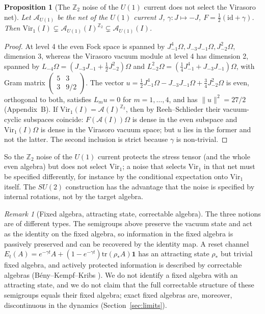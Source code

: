 \documentclass[12pt]{article}
\newtheorem{proposition}[theorem]{Proposition}
\theoremstyle{definition}
\theoremstyle{remark}
\newtheorem{remark}[theorem]{Remark}
\begin{document}
\begin{proposition}[The \(\mathbb Z_2\) noise of the \(U(1)\) current does not select the Virasoro net]\label{prop:U1}
Let \(\mathcal A_{U(1)}\) be the net of the \(U(1)\) current \(J\), \(\gamma:J\mapsto-J\),
\(F=\tfrac12(\mathrm{id}+\gamma)\). Then
\(\mathrm{Vir}_1(I)\subsetneq\mathcal A_{U(1)}(I)^{\mathbb Z_2}\subsetneq\mathcal A_{U(1)}(I)\).
\end{proposition}
\begin{proof}
At level 4 the even Fock space is spanned by \(J_{-1}^4\Omega,J_{-3}J_{-1}\Omega,J_{-2}^2\Omega\),
dimension 3, whereas the Virasoro vacuum module at level 4 has dimension 2, spanned by
\(L_{-4}\Omega=(J_{-3}J_{-1}+\tfrac12J_{-2}^2)\Omega\) and
\(L_{-2}^2\Omega=(\tfrac14J_{-1}^4+J_{-3}J_{-1})\Omega\), with Gram matrix
\(\left(\begin{smallmatrix}5&3\\3&9/2\end{smallmatrix}\right)\). The vector
\(u=\tfrac12J_{-1}^4\Omega-J_{-3}J_{-1}\Omega+\tfrac34J_{-2}^2\Omega\) is even,
orthogonal to both, satisfies \(L_mu=0\) for \(m=1,\dots,4\), and has
\(\|u\|^2=27/2\) (Appendix~B). If \(\mathrm{Vir}_1(I)=\mathcal A(I)^{\mathbb Z_2}\), then
by Reeh--Schlieder their vacuum-cyclic subspaces coincide: \(F(\mathcal A(I))\Omega\)
is dense in the even subspace and \(\mathrm{Vir}_1(I)\Omega\) is dense in the
Virasoro vacuum space; but \(u\) lies in the former and not the latter. The second
inclusion is strict because \(\gamma\) is non-trivial.
\end{proof}
So the \(\mathbb Z_2\) noise of the \(U(1)\) current protects the stress tensor (and the
whole even algebra) but does not select \(\mathrm{Vir}_1\); a noise that selects
\(\mathrm{Vir}_1\) in that net must be specified differently, for instance by the
conditional expectation onto \(\mathrm{Vir}_1\) itself. The \(SU(2)\) construction
has the advantage that the noise is specified by internal rotations, not by the target
algebra.

\begin{remark}[Fixed algebra, attracting state, correctable algebra]
The three notions are of different types. The semigroups above preserve the vacuum
state and act as the identity on the fixed algebra, so information in the fixed algebra
is passively preserved and can be recovered by the identity map. A reset channel \(E_t(A)=e^{-\gamma t}A+(1-e^{-\gamma t})\mathrm{tr}(\rho_*A)\mathbf 1\)
has an attracting state \(\rho_*\) but trivial fixed algebra, and actively protected
information is described by correctable algebras (B\'eny--Kempf--Kribs \cite{BKK}). We do
not identify a fixed algebra with an attracting state, and we do not claim that the full
correctable structure of these semigroups equals their fixed algebra; exact fixed
algebras are, moreover, discontinuous in the dynamics (Section~\ref{sec:limits}).
\end{remark}
\end{document}
